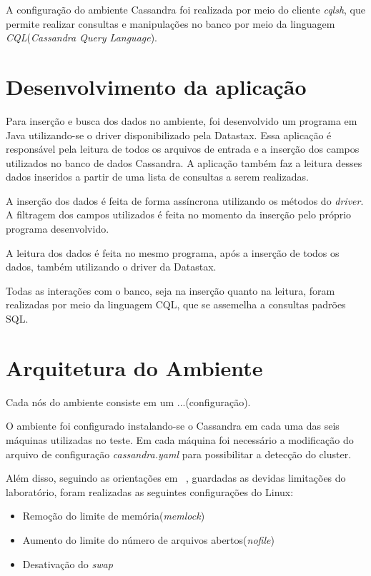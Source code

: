 A configuração do ambiente Cassandra foi realizada por meio do cliente \emph{cqlsh}, que permite realizar consultas e manipulações no banco por meio da linguagem \emph{CQL}(\emph{Cassandra Query Language}).

\section{Desenvolvimento da aplicação}
Para inserção e busca dos dados no ambiente, foi desenvolvido um programa em Java utilizando-se o driver disponibilizado pela Datastax. Essa aplicação é responsável pela leitura de todos os arquivos de entrada e a inserção dos campos utilizados no banco de dados Cassandra. A aplicação também faz a leitura desses dados inseridos a partir de uma lista de consultas a serem realizadas.

A inserção dos dados é feita de forma assíncrona utilizando os métodos do \emph{driver}. A filtragem dos campos utilizados é feita no momento da inserção pelo próprio programa desenvolvido.

A leitura dos dados é feita no mesmo programa, após a inserção de todos os dados, também utilizando o driver da Datastax.

Todas as interações com o banco, seja na inserção quanto na leitura, foram realizadas por meio da linguagem CQL, que se assemelha a consultas padrões SQL.

\section{Arquitetura do Ambiente}
Cada nós do ambiente consiste em um ...(configuração).

O ambiente foi configurado instalando-se o Cassandra em cada uma das seis máquinas utilizadas no teste. Em cada máquina foi necessário a modificação do arquivo de configuração \emph{cassandra.yaml} para possibilitar a detecção do cluster.

Além disso, seguindo as orientações em ~\cite{cassandrasettings}, guardadas as devidas limitações do laboratório, foram realizadas as seguintes configurações do Linux:
\begin{itemize}
	\item Remoção do limite de memória(\emph{memlock})
	\item Aumento do limite do número de arquivos abertos(\emph{nofile})
	\item Desativação do \emph{swap}
\end{itemize}




